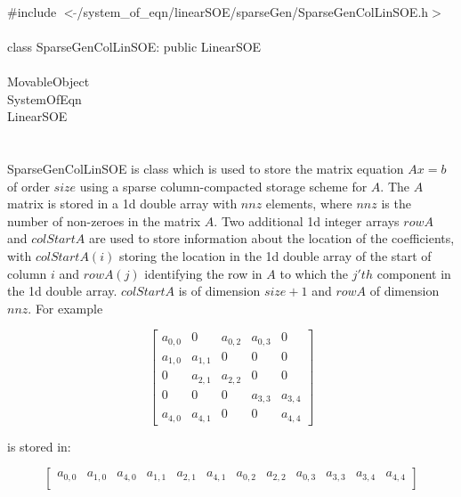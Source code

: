 
   \\
\indent \#include $<\tilde{ }$/system\_of\_eqn/linearSOE/sparseGen/SparseGenColLinSOE.h$>$  \\

  \\
\indent class SparseGenColLinSOE: public LinearSOE \\

 \\
\indent MovableObject \\
\indent\indent SystemOfEqn \\
\indent\indent\indent LinearSOE \\
\indent\indent\indent{} \\

  \\
\indent SparseGenColLinSOE is class which is used to store the matrix
equation $Ax=b$ of order $size$ using a sparse column-compacted storage
scheme for $A$. The $A$ matrix is stored in a 1d double array with
$nnz$ elements, where $nnz$ is the number of non-zeroes in the matrix
$A$. Two additional 1d integer arrays $rowA$ and $colStartA$ are used to
store information about the location of the coefficients, with $colStartA(i)$
storing the location in the 1d double array of the start of column $i$
and $rowA(j)$ identifying the row in $A$ to which the
$j'th$ component in the 1d double array. $colStartA$ is of
dimension $size+1$ and $rowA$ of dimension $nnz$. For example

$$
\left[
\begin{array}{ccccc}
a_{0,0} & 0 & a_{0,2}  & a_{0,3} & 0  \\
a_{1,0} & a_{1,1} & 0 & 0 & 0  \\
0 & a_{2,1} & a_{2,2} & 0 & 0 \\
0 & 0 & 0 & a_{3,3} & a_{3,4} \\
a_{4,0} & a_{4,1} & 0 & 0 & a_{4,4}
\end{array}
\right] 
$$

is stored in:

$$
\left[
\begin{array}{cccccccccccccc}
a_{0,0} & a_{1,0}  & a_{4,0} & a_{1,1} & a_{2,1} & a_{4,1} &
a_{0,2} & a_{2,2} & a_{0,3} & a_{3,3} & a_{3,4} & a_{4,4}  \\
\end{array}
\right] 
$$

